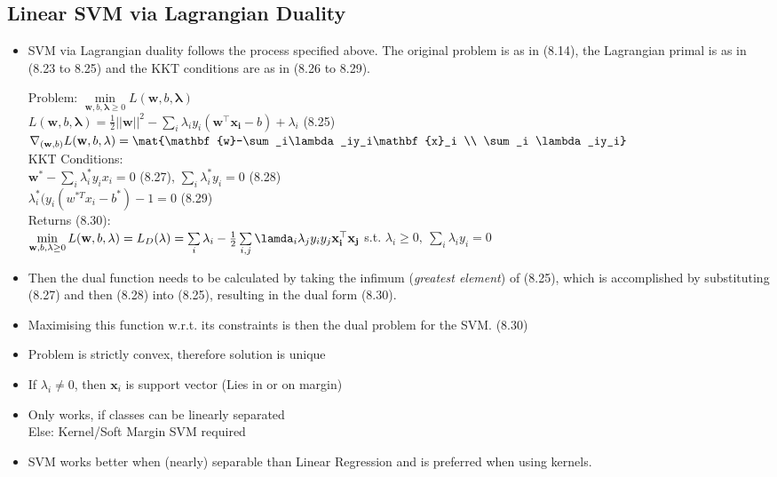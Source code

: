 \documentclass[english]{latex4ei/latex4ei_sheet}
\begin{document}
\begin{sectionbox}
\subsection{Linear SVM via Lagrangian Duality}
\begin{itemize}
\item SVM via Lagrangian duality follows the process specified above. The original problem is as in (8.14), the Lagrangian primal is as in (8.23 to 8.25) and the KKT conditions are as in (8.26 to 8.29). 
\begin{emphbox}
    Problem: $\min\limits_{\mathbf{w}, b, \mathbf{\lambda}\ge0} L(\mathbf{w}, b, \mathbf{\lambda})$ \\  $L(\mathbf{w}, b, \mathbf{\lambda})= \frac{1}{2}||\mathbf{w}||^2 - \sum\limits_i \lambda_i y_i(\mathbf{w^{\top}x_i}-b)+\lambda_i $ (8.25)\\
    		$\nabla_{(\mathbf{w},b)}L(\mathbf{w}, b, \mathbf{\lambda})=\mat{\mathbf{w}-\sum_i\lambda_iy_i\mathbf{x}_i \\ \sum_i \lambda_iy_i}$\\
    KKT Conditions:\\ $\mathbf{w^*}-\sum_i\lambda_i^*y_ix_i=0$ (8.27), \quad $\sum_i\lambda^*_iy_i=0$ (8.28)\\
    $\lambda_i^*(y_i(w^{*T}x_i-b^*)-1=0$ (8.29)\\
    Returns (8.30): \\
    $\min\limits_{\mathbf{w}, b, \mathbf{\lambda}\ge0} L(\mathbf{w}, b, \mathbf{\lambda})=L_D(\mathbf{\lambda})=
    \sum\limits_i\lambda_i-\frac{1}{2}\sum\limits_{i,j}\lamda_i\lambda_jy_iy_j\mathbf{x_i^{\top}x_j}$ s.t. $\lambda_i\ge0, \ \sum_i\lambda_iy_i=0$
\end{emphbox}

\item Then the dual function needs to be calculated by taking the infimum (\emph{greatest element}) of (8.25), which is accomplished by substituting (8.27) and then (8.28) into (8.25), resulting in the dual form (8.30).
\item Maximising this function w.r.t. its constraints is then the dual problem for the SVM. (8.30)

\item Problem is strictly convex, therefore solution is unique
\item If $\lambda_i \ne 0$, then $\mathbf{x}_i$ is support vector (Lies in or on margin)
\item Only works, if classes can be linearly separated \\
Else: Kernel/Soft Margin SVM required
\item SVM works better when (nearly) separable than Linear Regression and is preferred when using kernels.
\end{itemize}


\end{sectionbox}
\end{document}
